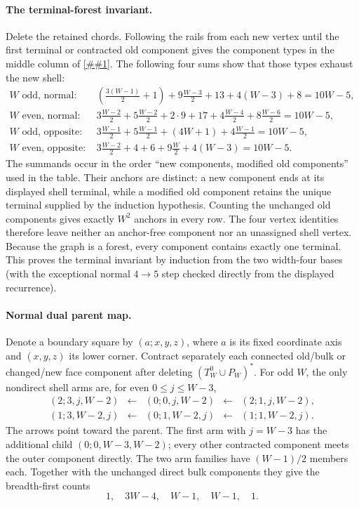 \documentclass[11pt]{article}
\newcommand{\cref}[1]{\autoref{##1}}%
\begin{document}
\paragraph{The terminal-forest invariant.}
Delete the retained chords.  Following the rails from each new vertex until
the first terminal or contracted old component gives the component types in
the middle column of \cref{tab:encoder-checks}.  The following four sums show
that those types exhaust the new shell:
\begin{align*}
 W\text{ odd, normal: }&
 \left(\frac{3(W-1)}2+1\right)
 +9\frac{W-3}2+13+4(W-3)+8=10W-5,\\
 W\text{ even, normal: }&
 3\frac{W-2}2+5\frac{W-2}2+2\cdot9+17
 +4\frac{W-4}2+8\frac{W-6}2=10W-5,\\
 W\text{ odd, opposite: }&
 3\frac{W-1}2+5\frac{W-1}2+(4W+1)
 +4\frac{W-1}2=10W-5,\\
 W\text{ even, opposite: }&
 3\frac{W-2}2+4+6+9\frac W2+4(W-3)=10W-5.
\end{align*}
The summands occur in the order ``new components, modified old
components'' used in the table.  Their anchors are distinct: a new component
ends at its displayed shell terminal, while a modified old component retains
the unique terminal supplied by the induction hypothesis.  Counting the
unchanged old components gives exactly \(W^2\) anchors in every row.  The
four vertex identities therefore leave neither an anchor-free component nor
an unassigned shell vertex.  Because the graph is a forest, every component
contains exactly one terminal.  This proves the terminal invariant by
induction from the two width-four bases (with the exceptional normal
\(4\to5\) step checked directly from the displayed recurrence).

\paragraph{Normal dual parent map.}
Denote a boundary square by \((a;x,y,z)\), where \(a\) is its fixed
coordinate axis and \((x,y,z)\) its lower corner.  Contract separately each
connected old/bulk or changed/new face component after deleting
\((T_W^0\cup P_W)^*\).  For odd \(W\), the only nondirect shell arms are,
for even \(0\le j\le W-3\),
\[
 \begin{array}{ccccc}
 (2;3,j,W-2)&\longleftarrow&(0;0,j,W-2)
 &\longleftarrow&(2;1,j,W-2),\\
 (1;3,W-2,j)&\longleftarrow&(0;1,W-2,j)
 &\longleftarrow&(1;1,W-2,j).
 \end{array}
\]
The arrows point toward the parent.  The first arm with \(j=W-3\) has the
additional child \((0;0,W-3,W-2)\); every other contracted component meets
the outer component directly.  The two arm families have \((W-1)/2\)
members each.  Together with the unchanged direct bulk components they give
the breadth-first counts
\[
 1,\quad 3W-4,\quad W-1,\quad W-1,\quad1.
\]
\end{document}
